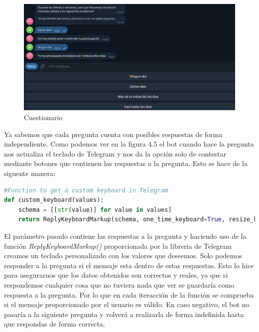 \begin{figure}[!ht]
    \centering
    \includegraphics[width=1\textwidth]{imagenes/question.png}
    \caption{ Cuestionario }
    \label{fig:enter-label}
\end{figure}\vspace{0.3cm}

Ya sabemos que cada pregunta cuenta con posibles respuestas de forma independiente. Como podemos ver en la figura 4.5 el bot cuando hace la pregunta nos actualiza el teclado de Telegram y nos da la opción solo de contestar mediante botones que contienen las respuestas a la pregunta. Esto se hace de la siguente manera:

\begin{lstlisting}[language=Python]
#Function to get a custom keyboard in Telegram
def custom_keyboard(values):
    schema = [[str(value)] for value in values]
    return ReplyKeyboardMarkup(schema, one_time_keyboard=True, resize_keyboard=True)
\end{lstlisting}

El parámetro pasado contiene las respuestas a la pregunta y haciendo uso de la función \textit{ReplyKeyboardMarkup()} proporcionada por la libreria de Telegram creamos un teclado personalizado con los valores que deseemos. Solo podemos responder a la pregunta si el mensaje esta dentro de estas respuestas. Esto lo hice para asegurarnos que los datos obtenidos son correctos y reales, ya que si respondemos cualquier cosa que no tuviera nada que ver se guardaría como respuesta a la pregunta. Por lo que en cada iteracción de la función se comprueba si el mensaje proporcionado por el usuario es válido. En caso negativo, el bot no pasaría a la siguiente pregunta y volverá a realizarla de forma indefinida hasta que respondas de forma correcta. \vspace{0.3cm}

